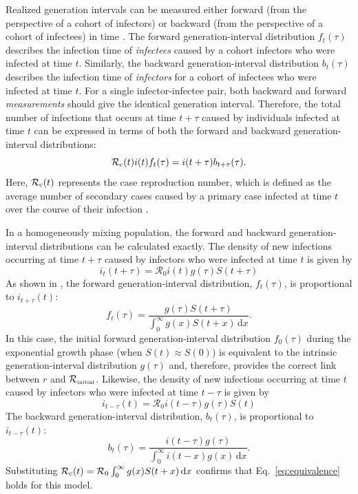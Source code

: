 \documentclass[12pt]{article}
\newcommand{\eref}[1]{Eq.~\ref{eq:#1}}
\newcommand{\Rx}[1]{\ensuremath{{\mathcal R}_{#1}}\xspace}
\newcommand{\RR}{\ensuremath{{\mathcal R}}}
\newcommand{\Rini}{\Rx{\textrm{\tiny initial}}}
\begin{document}
Realized generation intervals can be measured either forward (from the perspective of a cohort of infectors) or backward (from the perspective of a cohort of infectees) in time \citep{champredon2015intrinsic, britton2019estimation}.
The forward generation-interval distribution $f_t(\tau)$ describes the infection time of \emph{infectees} caused by a cohort infectors who were infected at time $t$.
Similarly, the backward generation-interval distribution $b_t(\tau)$ describes the infection time of \emph{infectors} for a cohort of infectees who were infected at time $t$.
For a single infector-infectee pair, both backward and forward \emph{measurements} should give the identical generation interval.
Therefore, the total number of infections that occurs at time $t + \tau$ caused by individuals infected at time $t$ can be expressed in terms of both the forward and backward generation-interval distributions:
\begin{equation}
\mathcal R_{\rm c}(t) i(t) f_t(\tau) = i(t+\tau) b_{t+\tau}(\tau).
\label{eq:equivalence}
\end{equation}
Here, $\mathcal R_{\rm c}(t)$ represents the case reproduction number, which is defined as the average number of secondary cases caused by a primary case infected at time $t$ over the course of their infection \citep{fraser2007estimating}.

In a homogeneously mixing population, the forward and backward generation-interval distributions can be calculated exactly.
The density of new infections occurring at time $t+\tau$ caused by infectors who were infected at time $t$ is given by
\begin{equation}
i_{t}(t+\tau) = \RR_0 i(t) g(\tau) S(t+\tau)
\end{equation}
As shown in \cite{champredon2015intrinsic}, the forward generation-interval distribution, $f_t(\tau)$, is proportional to $i_{t+\tau}(t)$:
\begin{equation}
f_t(\tau) = \frac{g(\tau) S(t+\tau)}{\int_0^\infty g(x) S(t+x) \,\mathrm{d}x}.
\label{eq:forward}
\end{equation}
In this case, the initial forward generation-interval distribution $f_0(\tau)$ during the exponential growth phase (when $S(t) \approx S(0)$) is equivalent to the intrinsic generation-interval distribution $g(\tau)$ and, therefore, provides the correct link between $r$ and \Rini.
Likewise, the density of new infections occurring at time $t$ caused by infectors who were infected at time $t-\tau$ is given by
\begin{equation}
i_{t-\tau}(t) = \RR_0 i(t-\tau) g(\tau) S(t)
\end{equation}
The backward generation-interval distribution, $b_t(\tau)$, is proportional to $i_{t-\tau}(t)$:
\begin{equation}
b_t(\tau) = \frac{i(t-\tau) g(\tau)}{\int_0^\infty i(t-x) g(x)\,\mathrm{d}x}.
\end{equation}
Substituting $\mathcal R_{\rm c}(t) = \mathcal R_0 \int_0^\infty g(x) S(t+x) \,\mathrm{d}x$ confirms that \eref{equivalence} holds for this model.
\end{document}
